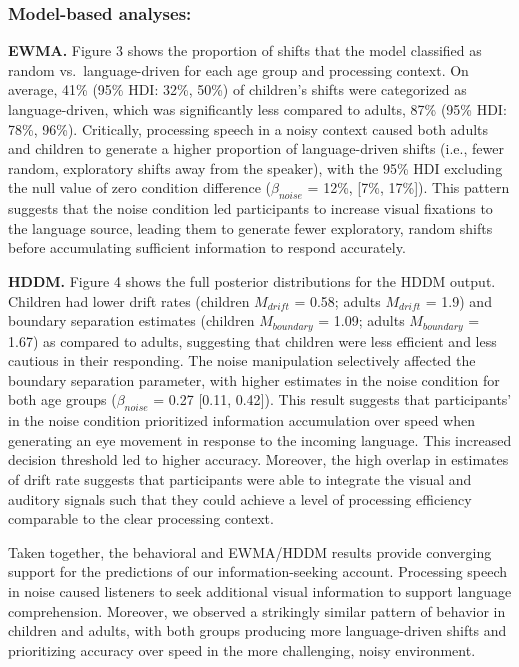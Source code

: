 \documentclass[10pt, letterpaper]{article}
\begin{document}
\subsubsection{Model-based analyses:}\label{model-based-analyses}

\textbf{EWMA.} Figure 3 shows the proportion of shifts that the model
classified as random vs.~language-driven for each age group and
processing context. On average, 41\% (95\% HDI: 32\%, 50\%) of
children's shifts were categorized as language-driven, which was
significantly less compared to adults, 87\% (95\% HDI: 78\%, 96\%).
Critically, processing speech in a noisy context caused both adults and
children to generate a higher proportion of language-driven shifts
(i.e., fewer random, exploratory shifts away from the speaker), with the
95\% HDI excluding the null value of zero condition difference
(\(\beta_{noise}\) = 12\%, {[}7\%, 17\%{]}). This pattern suggests that
the noise condition led participants to increase visual fixations to the
language source, leading them to generate fewer exploratory, random
shifts before accumulating sufficient information to respond accurately.

\textbf{HDDM.} Figure 4 shows the full posterior distributions for the
HDDM output. Children had lower drift rates (children \(M_{drift}\) =
0.58; adults \(M_{drift}\) = 1.9) and boundary separation estimates
(children \(M_{boundary}\) = 1.09; adults \(M_{boundary}\) = 1.67) as
compared to adults, suggesting that children were less efficient and
less cautious in their responding. The noise manipulation selectively
affected the boundary separation parameter, with higher estimates in the
noise condition for both age groups (\(\beta_{noise}\) = 0.27 {[}0.11,
0.42{]}). This result suggests that participants' in the noise condition
prioritized information accumulation over speed when generating an eye
movement in response to the incoming language. This increased decision
threshold led to higher accuracy. Moreover, the high overlap in
estimates of drift rate suggests that participants were able to
integrate the visual and auditory signals such that they could achieve a
level of processing efficiency comparable to the clear processing
context.

Taken together, the behavioral and EWMA/HDDM results provide converging
support for the predictions of our information-seeking account.
Processing speech in noise caused listeners to seek additional visual
information to support language comprehension. Moreover, we observed a
strikingly similar pattern of behavior in children and adults, with both
groups producing more language-driven shifts and prioritizing accuracy
over speed in the more challenging, noisy environment.
\end{document}
